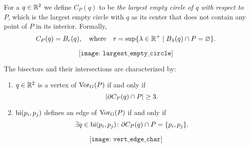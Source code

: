 \begin{defn}
For a $q \in \mathbb{R}^2$ we define $C_P(q)$ to be \emph{the largest empty circle of $q$ with respect to $P$}, which is the largest empty circle with $q$ as its center that does not contain any point of $P$ in its interior. Formally,
\[
    C_P(q) = B_r(q), \quad \text{where} \quad r = \sup\{\lambda \in \mathbb{R}^+ \mid B_{\lambda}(q) \cap P = \varnothing\}.
\]
\end{defn}
\[
    \texttt{[image: largest\_empty\_circle]}
\]
\begin{thm} \label{thm:characterizationofbisectors} The bisectors and their intersections are characterized by:
\begin{enumerate}[{(}i{)}]
    \item $q \in \mathbb{R}^2$ is a vertex of $\operatorname{Vor_{G}}(P)$ if and only if \[ \left\lvert \partial C_P(q) \cap P \right\rvert \geq 3. \]
    \item $\operatorname{bi}(p_i, p_j)$ defines an edge of $\operatorname{Vor_{G}}(P)$ if and only if \[ \exists q \in \operatorname{bi}(p_i, p_j) \colon \partial C_P(q) \cap P = \{p_i, p_j\}. \]
\end{enumerate}
\end{thm}
\[
    \texttt{[image: vert\_edge\_char]}
\]

